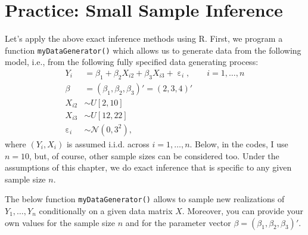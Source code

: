 \documentclass[
  14pt,
]{memoir}
\DeclareMathOperator{\eps}{\varepsilon}
\begin{document}
\hypertarget{PSSI}{%
\section{Practice: Small Sample Inference}\label{PSSI}}

Let's apply the above exact inference methods using \textsf{R}. First, we program a function \texttt{myDataGenerator()} which allows us to generate data from the following model, i.e., from the following fully specified data generating process:
\begin{align*}
Y_i &=\beta_1+\beta_2X_{i2}+\beta_3X_{i3}+\eps_i,\qquad i=1,\dots,n\\
\beta &=(\beta_1,\beta_2,\beta_3)'=(2,3,4)'\\
X_{i2}&\sim U[2,10]\\
X_{i3}&\sim U[12,22]\\
\eps_i&\sim\mathcal{N}(0,3^2),
\end{align*}
where \((Y_i,X_i)\) is assumed i.i.d. across \(i=1,\dots,n\). Below, in the codes, I use \(n=10\), but, of course, other sample sizes can be considered too. Under the assumptions of this chapter, we do exact inference that is specific to any given sample size \(n\).

The below function \texttt{myDataGenerator()} allows to sample new realizations of \(Y_1,\dots,Y_n\) conditionally on a given data matrix \(X\). Moreover, you can provide your own values for the sample size \(n\) and for the parameter vector \(\beta=(\beta_1,\beta_2,\beta_3)'\).
\end{document}
